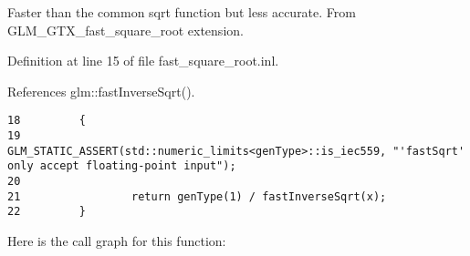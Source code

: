 Faster than the common sqrt function but less accurate. From GLM\_\-GTX\_\-fast\_\-square\_\-root extension. 

Definition at line 15 of file fast\_\-square\_\-root.inl.

References glm::fastInverseSqrt().

\begin{Code}\begin{verbatim}18         {
19                 GLM_STATIC_ASSERT(std::numeric_limits<genType>::is_iec559, "'fastSqrt' only accept floating-point input");
20 
21                 return genType(1) / fastInverseSqrt(x);
22         }
\end{verbatim}
\end{Code}




Here is the call graph for this function: